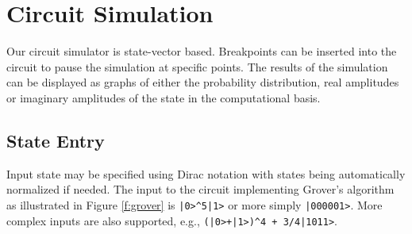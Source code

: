 \documentclass[aps,prl,reprint,floatfix,superscriptaddress]{revtex4-1} %
\begin{document}
\section{Circuit Simulation}
Our circuit simulator is state-vector based.
Breakpoints can be inserted into the circuit to pause the simulation at specific points.
The results of the simulation can be displayed as graphs of either the probability distribution, real amplitudes or imaginary amplitudes of the state in the computational basis.
\subsection{State Entry}
Input state may be specified using Dirac notation with states being automatically normalized if needed.
The input to the circuit implementing Grover's algorithm as illustrated in Figure \ref{f:grover} is \verb$|0>^5|1>$ or more simply \verb$|000001>$. 
More complex inputs are also supported, e.g., \verb$(|0>+|1>)^4 + 3/4|1011>$.



\end{document}
